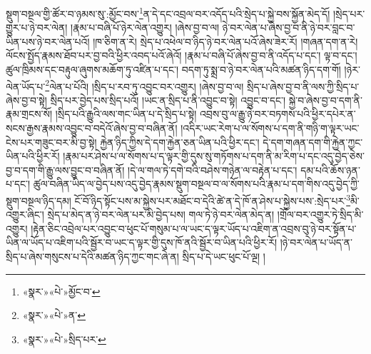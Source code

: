 སྡུག་བསྔལ་གྱི་ཚོར་བ་ཉམས་སུ་:མྱོང་བས་\footnote{«སྣར་»«པེ་»མྱོང་བ་}ན་དེ་དང་འབྲལ་བར་འདོད་པའི་སྲེད་པ་སྐྱེ་བས་སྐྱོན་མེད་དོ། །སྲེད་པར་གྱུར་པ་ཉེ་བར་ལེན། །རྣམ་པ་བཞི་པོ་ཉེར་ལེན་འགྱུར། །ཞེས་བྱ་བ་ལ། ཉེ་བར་ལེན་པ་ཞེས་བྱ་བ་ནི་ཉེ་བར་བླང་བ་ཡིན་པས་ཉེ་བར་ལེན་པའོ། །ཁ་ཅིག་ན་རེ། སྲེད་པ་འཕེལ་བ་ཉིད་ཉེ་བར་ལེན་པའོ་ཞེས་ཟེར་རོ། །གཞན་དག་ན་རེ། ལོངས་སྤྱོད་རྣམས་ཐོབ་པར་བྱ་བའི་ཕྱིར་འབད་པའོ་ཞེའོ། །རྣམ་པ་བཞི་པོ་ཞེས་བྱ་བ་ནི་འདོད་པ་དང་། ལྟ་བ་དང་། ཚུལ་ཁྲིམས་དང་བརྟུལ་ཞུགས་མཆོག་ཏུ་འཛིན་པ་དང་། བདག་ཏུ་སྨྲ་བ་ཉེ་བར་ལེན་པའི་མཚན་ཉིད་དག་གོ། །ཉེར་ལེན་ཡོད་པ་\footnote{«སྣར་»«པེ་»ན་}ལེན་པ་པོའི། །སྲིད་པ་རབ་ཏུ་འབྱུང་བར་འགྱུར། །ཞེས་བྱ་བ་ལ། སྲིད་པ་ཞེས་བྱ་བ་ནི་ལས་ཀྱི་སྲིད་པ་ཞེས་བྱ་བ་སྟེ། སྲིད་པར་བྱེད་པས་སྲིད་པའོ། །ཡང་ན་སྲིད་པ་ནི་འབྱུང་བ་སྟེ། འབྱུང་བ་དང་། སྐྱེ་བ་ཞེས་བྱ་བ་དག་ནི་རྣམ་གྲངས་སོ། །སྲིད་པའི་རྒྱུའི་ལས་གང་ཡིན་པ་དེ་སྲིད་པ་སྟེ། འབྲས་བུ་ལ་རྒྱུ་ཉེ་བར་བཏགས་པའི་ཕྱིར་དཔེར་ན་སངས་རྒྱས་རྣམས་འབྱུང་བ་བདེའོ་ཞེས་བྱ་བ་བཞིན་ནོ། །འདིར་ཡང་རེག་པ་ལ་སོགས་པ་དག་ནི་གཉི་ག་ལྟར་ཡང་ངེས་པར་གཟུང་བར་མི་བྱ་སྟེ། རྐྱེན་ཉིད་ཀྱིས་དེ་དག་རྐྱེན་ཅན་ཡིན་པའི་ཕྱིར་དང་། དེ་དག་གཞན་དག་གི་རྐྱེན་ཀྱང་ཡིན་པའི་ཕྱིར་རོ། །རྣམ་པར་ཤེས་པ་ལ་སོགས་པ་ད་ལྟར་གྱི་དུས་སུ་གཏོགས་པ་དག་ནི་མ་རིག་པ་དང་འདུ་བྱེད་ཅེས་བྱ་བ་དག་གི་རྒྱུ་ལས་བྱུང་བ་བཞིན་ནོ། །དེ་ལ་གལ་ཏེ་དགེ་བའི་བཤེས་གཉེན་ལ་བརྟེན་པ་དང་། དམ་པའི་ཆོས་ཉན་པ་དང་། ཚུལ་བཞིན་ཡིད་ལ་བྱེད་པས་འདུ་བྱེད་རྣམས་སྡུག་བསྔལ་བ་ལ་སོགས་པའི་རྣམ་པ་དག་གིས་འདུ་བྱེད་ཀྱི་སྡུག་བསྔལ་ཉིད་དམ། ངོ་བོ་ཉིད་སྟོང་པས་མ་སྐྱེས་པར་མཐོང་བ་དེའི་ཚེ་ན་དེ་ཁོ་ན་ཤེས་པ་སྐྱེས་པས་:སྲེད་པར་\footnote{«སྣར་»«པེ་»སྲིད་པར་}མི་འགྱུར་ཞིང་། སྲེད་པ་མེད་ན་ཉེ་བར་ལེན་པར་མི་བྱེད་པས། གལ་ཏེ་ཉེ་བར་ལེན་མེད་ན། །གྲོལ་བར་འགྱུར་ཏེ་སྲིད་མི་འགྱུར། །རྟེན་ཅིང་འབྲེལ་པར་འབྱུང་བ་ཕུང་པོ་གསུམ་པ་ལ་ཡང་ད་ལྟར་ཡོད་པ་འཇིག་ན་འབྲས་བུ་ཉེ་བར་སྟོན་པ་ཡིན་ལ་ཡོད་པ་འཇིག་པའི་སྦྱོར་བ་ཡང་ད་ལྟར་གྱི་དུས་ཁོ་ནའི་སྦྱོར་བ་ཡིན་པའི་ཕྱིར་རོ། །ཉེ་བར་ལེན་པ་ཡོད་ན་སྲིད་པ་ཞེས་གསུངས་པ་དེའི་མཚན་ཉིད་ཀྱང་གང་ཞེ་ན། སྲིད་པ་དེ་ཡང་ཕུང་པོ་ལྔ། །
